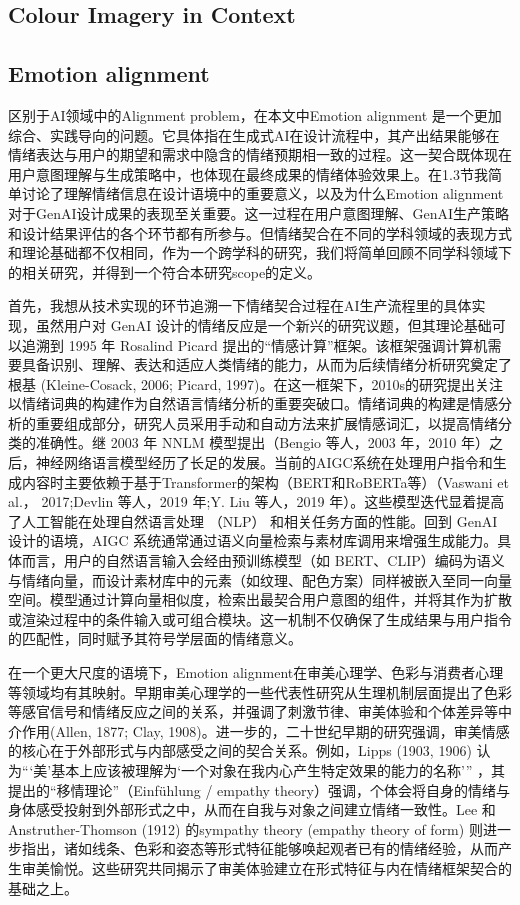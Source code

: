 \subsection{Colour Imagery in Context}

\subsection{Emotion alignment}

区别于AI领域中的Alignment problem，在本文中Emotion alignment 是一个更加综合、实践导向的问题。它具体指在生成式AI在设计流程中，其产出结果能够在情绪表达与用户的期望和需求中隐含的情绪预期相一致的过程。这一契合既体现在用户意图理解与生成策略中，也体现在最终成果的情绪体验效果上。在1.3节我简单讨论了理解情绪信息在设计语境中的重要意义，以及为什么Emotion alignment对于GenAI设计成果的表现至关重要。这一过程在用户意图理解、GenAI生产策略和设计结果评估的各个环节都有所参与。但情绪契合在不同的学科领域的表现方式和理论基础都不仅相同，作为一个跨学科的研究，我们将简单回顾不同学科领域下的相关研究，并得到一个符合本研究scope的定义。

首先，我想从技术实现的环节追溯一下情绪契合过程在AI生产流程里的具体实现，虽然用户对 GenAI 设计的情绪反应是一个新兴的研究议题，但其理论基础可以追溯到 1995 年 Rosalind Picard 提出的“情感计算”框架。该框架强调计算机需要具备识别、理解、表达和适应人类情绪的能力，从而为后续情绪分析研究奠定了根基 (Kleine-Cosack, 2006; Picard, 1997)。在这一框架下，2010s的研究提出关注以情绪词典的构建作为自然语言情绪分析的重要突破口。情绪词典的构建是情感分析的重要组成部分，研究人员采用手动和自动方法来扩展情感词汇，以提高情绪分类的准确性。继 2003 年 NNLM 模型提出（Bengio 等人，2003 年，2010 年）之后，神经网络语言模型经历了长足的发展。当前的AIGC系统在处理用户指令和生成内容时主要依赖于基于Transformer的架构（BERT和RoBERTa等）（Vaswani et al.， 2017;Devlin 等人，2019 年;Y. Liu 等人，2019 年）。这些模型迭代显着提高了人工智能在处理自然语言处理 （NLP） 和相关任务方面的性能。回到 GenAI 设计的语境，AIGC 系统通常通过语义向量检索与素材库调用来增强生成能力。具体而言，用户的自然语言输入会经由预训练模型（如 BERT、CLIP）编码为语义与情绪向量，而设计素材库中的元素（如纹理、配色方案）同样被嵌入至同一向量空间。模型通过计算向量相似度，检索出最契合用户意图的组件，并将其作为扩散或渲染过程中的条件输入或可组合模块。这一机制不仅确保了生成结果与用户指令的匹配性，同时赋予其符号学层面的情绪意义。

在一个更大尺度的语境下，Emotion alignment在审美心理学、色彩与消费者心理等领域均有其映射。早期审美心理学的一些代表性研究从生理机制层面提出了色彩等感官信号和情绪反应之间的关系，并强调了刺激节律、审美体验和个体差异等中介作用(Allen, 1877; Clay, 1908)。进一步的，二十世纪早期的研究强调，审美情感的核心在于外部形式与内部感受之间的契合关系。例如，Lipps (1903, 1906) 认为“‘美’基本上应该被理解为‘一个对象在我内心产生特定效果的能力的名称’” ，其提出的“移情理论”（Einfühlung / empathy theory）强调，个体会将自身的情绪与身体感受投射到外部形式之中，从而在自我与对象之间建立情绪一致性。Lee 和 Anstruther-Thomson (1912) 的sympathy theory (empathy theory of form) 则进一步指出，诸如线条、色彩和姿态等形式特征能够唤起观者已有的情绪经验，从而产生审美愉悦。这些研究共同揭示了审美体验建立在形式特征与内在情绪框架契合的基础之上。

